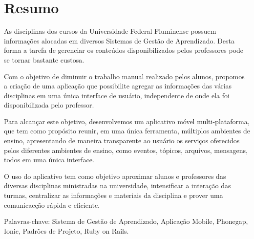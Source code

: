 
\chapter*{Resumo}

\thispagestyle{myheadings}

As disciplinas dos cursos da Universidade Federal Fluminense possuem informações alocadas em diversos Sistemas de Gestão de Aprendizado. Desta forma a tarefa de gerenciar os conteúdos disponibilizados pelos professores pode se tornar bastante custosa. 

Com o objetivo de diminuir o trabalho manual realizado pelos alunos, propomos a criação de uma aplicação que possibilite agregar as informações das várias disciplinas em uma única interface de usuário, independente de onde ela foi disponibilizada pelo professor.

Para alcançar este objetivo, desenvolvemos um aplicativo móvel multi-plataforma, que tem como propósito reunir, em uma única ferramenta, múltiplos ambientes de ensino, apresentando de maneira transparente ao usuário os serviços oferecidos pelos diferentes ambientes de ensino, como eventos, tópicos, arquivos, mensagens, todos em uma única interface. 

O uso do aplicativo tem como objetivo aproximar alunos e professores das diversas disciplinas ministradas na universidade, intensificar a interação das turmas, centralizar as informações e materiais da disciplina e prover uma comunicacção rápida e eficiente.

Palavras-chave: Sistema de Gestão de Aprendizado, Aplicação Mobile, Phonegap, Ionic, Padrões de Projeto, Ruby on Rails.


